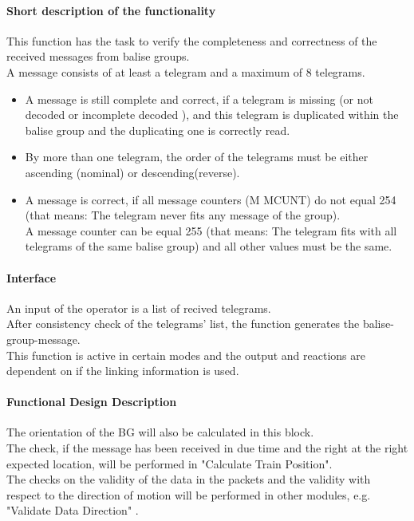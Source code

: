 \paragraph{Short description of the functionality}
This function has the task  to verify the completeness and correctness of the received messages from balise groups.\\
A message consists of at least a telegram and a maximum of 8 telegrams.\\

\begin{itemize}
\item A message is still complete and correct, if a telegram is missing (or not decoded or incomplete decoded ), and this telegram is duplicated within the balise group and the duplicating one is correctly read.
\item By more than one telegram, the order of the telegrams must be either ascending (nominal) or descending(reverse).\\
\item A message is correct, if  all message counters (M MCUNT) do not equal 254 (that means: The telegram never fits any message of the group).\\ A message counter can be equal 255 (that means: The telegram fits with all telegrams of the same balise group) and all other values must be the same.\\
\end{itemize}

\paragraph{Interface}
An input of the operator is a list of recived telegrams. \\
After consistency check of the telegrams' list, the function generates the balise-group-message.\\
This function is active in certain modes and the output and reactions are dependent on if the linking information is used.\\

\paragraph{Functional Design Description}
The orientation of the BG will also be calculated in this block.\\
The check, if the message has been received in due time and the right at the right expected location, will be performed in "Calculate Train Position".\\
The checks on the validity of the data in the packets and the validity with respect to the direction of motion will be performed in other modules, e.g. "Validate Data Direction" .

